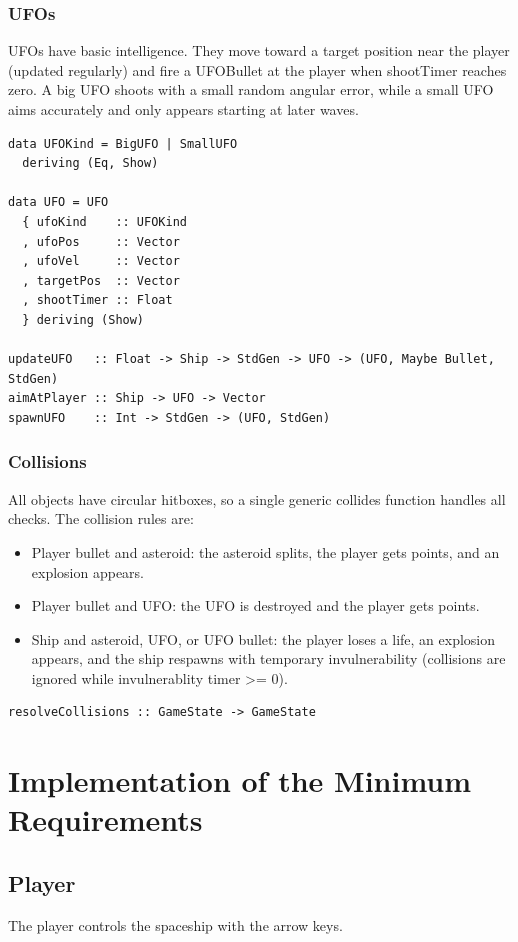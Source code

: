 \documentclass{article}
\begin{document}
\subsubsection{UFOs}
UFOs have basic intelligence. They move toward a target position near the player (updated regularly) and fire a UFOBullet at the player when shootTimer reaches zero. A big UFO shoots with a small random angular error, while a small UFO aims accurately and only appears starting at later waves.
\begin{lstlisting}
data UFOKind = BigUFO | SmallUFO
  deriving (Eq, Show)

data UFO = UFO
  { ufoKind    :: UFOKind
  , ufoPos     :: Vector
  , ufoVel     :: Vector
  , targetPos  :: Vector
  , shootTimer :: Float
  } deriving (Show)

updateUFO   :: Float -> Ship -> StdGen -> UFO -> (UFO, Maybe Bullet, StdGen)
aimAtPlayer :: Ship -> UFO -> Vector
spawnUFO    :: Int -> StdGen -> (UFO, StdGen)
\end{lstlisting}

\subsubsection{Collisions}
All objects have circular hitboxes, so a single generic collides function handles all checks. The collision rules are:
\begin{itemize}
  \item Player bullet and asteroid: the asteroid splits, the player gets points, and an explosion appears.
  \item Player bullet and UFO: the UFO is destroyed and the player gets points.
  \item Ship and asteroid, UFO, or UFO bullet: the player loses a life, an explosion appears, and the ship respawns with temporary invulnerability (collisions are ignored while invulnerablity timer >= 0).
\end{itemize}
\begin{lstlisting}
resolveCollisions :: GameState -> GameState
\end{lstlisting}

\section{Implementation of the Minimum Requirements}
\subsection{Player}
The player controls the spaceship with the arrow keys.
\end{document}
